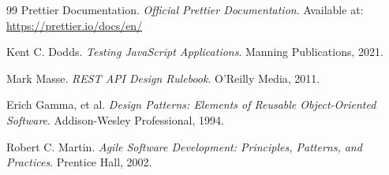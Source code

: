 \begin{thebibliography}{99}
Prettier Documentation. 
\emph{Official Prettier Documentation}. 
Available at: \url{https://prettier.io/docs/en/}

Kent C. Dodds. 
\emph{Testing JavaScript Applications}. 
Manning Publications, 2021.

Mark Masse. 
\emph{REST API Design Rulebook}. 
O'Reilly Media, 2011.

Erich Gamma, et al. 
\emph{Design Patterns: Elements of Reusable Object-Oriented Software}. 
Addison-Wesley Professional, 1994.

Robert C. Martin. 
\emph{Agile Software Development: Principles, Patterns, and Practices}. 
Prentice Hall, 2002.

\end{thebibliography} 